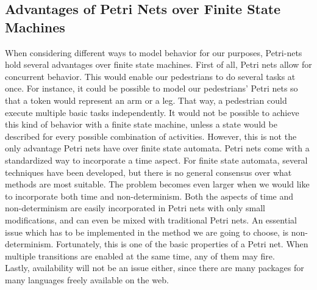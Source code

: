 \documentclass[11pt, a4paper]{book}
\begin{document}
\subsection{Advantages of Petri Nets over Finite State Machines}
When considering different ways to model behavior for our purposes, Petri-nets hold several advantages over finite state machines. First of all, Petri nets allow for concurrent behavior. This would enable our pedestrians to do several tasks at once. For instance, it could be possible to model our pedestrians' Petri nets so that a token would represent an arm or a leg. That way, a pedestrian could execute multiple basic tasks independently. It would not be possible to achieve this kind of behavior with a finite state machine, unless a state would be described for every possible combination of activities.
However, this is not the only advantage Petri nets have over finite state automata. Petri nets come with a standardized way to incorporate a time aspect. For finite state automata, several techniques have been developed, but there is no general consensus over what methods are most suitable. The problem becomes even larger when we would like to incorporate both time and non-determinism. Both the aspects of time and non-determinism are easily incorporated in Petri nets with only small modifications, and can even be mixed with traditional Petri nets.
An essential issue which has to be implemented in the method we are going to choose, is non-determinism. Fortunately, this is one of the basic properties of a Petri net. When multiple transitions are enabled at the same time, any of them may fire.\\
Lastly, availability will not be an issue either, since there are many packages for many languages freely available on the web.
\end{document}
